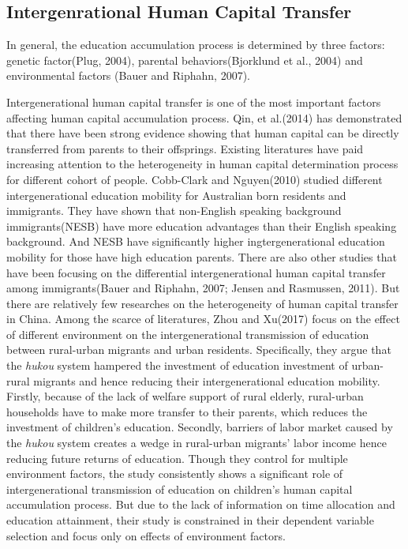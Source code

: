 \documentclass[12pt]{article}%
\theoremstyle{definition}
\numberwithin{equation}{section}
\begin{document}
\subsection{Intergenrational Human Capital Transfer}
 In general, the education accumulation process is determined by three factors: genetic factor(Plug, 2004), parental behaviors(Bjorklund et al., 2004) and environmental factors (Bauer and Riphahn, 2007).\par
 
Intergenerational human capital transfer is one of the most important factors affecting human capital accumulation process. Qin, et al.(2014) has demonstrated that there have been strong evidence showing that human capital can be directly transferred from parents to their offsprings. Existing literatures have paid increasing attention to the heterogeneity in human capital determination process for different cohort of people. Cobb-Clark and Nguyen(2010) studied different intergenerational education mobility for Australian born residents and immigrants. They have shown that non-English speaking background immigrants(NESB) have more education advantages than their English speaking background. And NESB have significantly higher ingtergenerational education mobility for those have high education parents. There are also other studies that have been focusing on the differential intergenerational human capital transfer among immigrants(Bauer and Riphahn, 2007; Jensen and Rasmussen, 2011). But there are relatively few researches on the heterogeneity of human capital transfer in China. Among the scarce of literatures, Zhou and Xu(2017)  focus on the effect of different environment on the intergenerational transmission of education between rural-urban migrants and urban residents. Specifically, they argue that the 	\textit{hukou} system hampered the investment of education investment of urban-rural migrants and hence reducing their intergenerational education mobility. Firstly, because of the lack of welfare support of rural elderly, rural-urban households have to make more transfer to their parents, which reduces the investment of children's education. Secondly, barriers of labor market caused by the \textit{hukou} system creates a wedge in rural-urban migrants' labor income hence reducing future returns of education. Though they control for multiple environment factors, the study consistently shows a significant role of intergenerational transmission of education on children's human capital accumulation process. But due to the lack of information on time allocation and education attainment, their study is constrained in their dependent variable selection and focus only on effects of environment factors.\par
\end{document}
